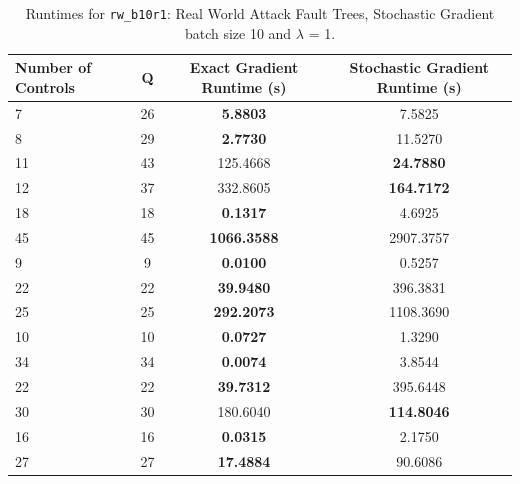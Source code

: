 \documentclass{article}
\begin{document}
\begin{table}[h]
\centering
\begin{tabular}{lccc}
\toprule
Number of Controls & Q & Exact Gradient Runtime (s) & Stochastic Gradient Runtime (s) \\
\midrule
7 & 26 & \textbf{5.8803} & 7.5825 \\
8 & 29 & \textbf{2.7730} & 11.5270 \\
11 & 43 & 125.4668 & \textbf{24.7880} \\
12 & 37 & 332.8605 & \textbf{164.7172} \\
18 & 18 & \textbf{0.1317} & 4.6925 \\
45 & 45 & \textbf{1066.3588} & 2907.3757 \\
9 & 9 & \textbf{0.0100} & 0.5257 \\
22 & 22 & \textbf{39.9480} & 396.3831 \\
25 & 25 & \textbf{292.2073} & 1108.3690 \\
10 & 10 & \textbf{0.0727} & 1.3290 \\
34 & 34 & \textbf{0.0074} & 3.8544 \\
22 & 22 & \textbf{39.7312} & 395.6448 \\
30 & 30 & 180.6040 & \textbf{114.8046} \\
16 & 16 & \textbf{0.0315} & 2.1750 \\
27 & 27 & \textbf{17.4884} & 90.6086 \\
\bottomrule
\end{tabular}
\caption{Runtimes for \texttt{rw\_b10r1}: Real World Attack Fault Trees, Stochastic Gradient batch size 10 and $\lambda$ = 1.}
\end{table}
\end{document}
